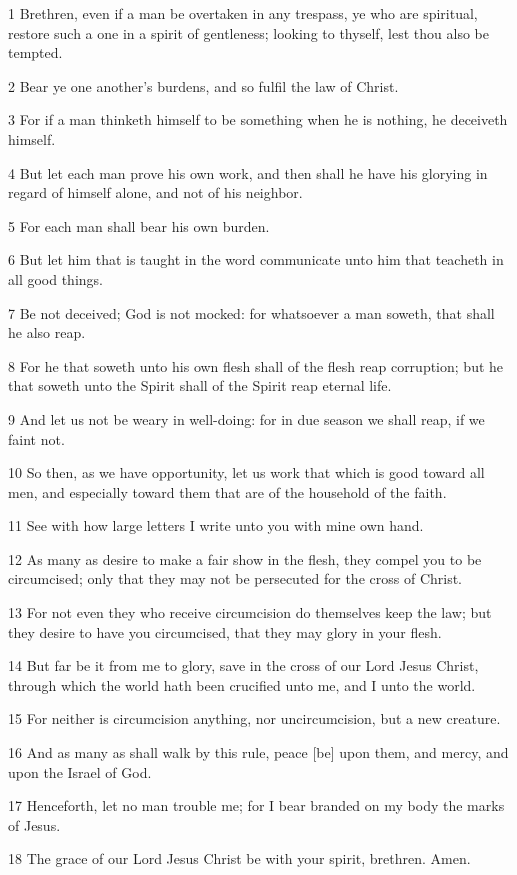 \par 1 Brethren, even if a man be overtaken in any trespass, ye who are spiritual, restore such a one in a spirit of gentleness; looking to thyself, lest thou also be tempted.
\par 2 Bear ye one another's burdens, and so fulfil the law of Christ.
\par 3 For if a man thinketh himself to be something when he is nothing, he deceiveth himself.
\par 4 But let each man prove his own work, and then shall he have his glorying in regard of himself alone, and not of his neighbor.
\par 5 For each man shall bear his own burden.
\par 6 But let him that is taught in the word communicate unto him that teacheth in all good things.
\par 7 Be not deceived; God is not mocked: for whatsoever a man soweth, that shall he also reap.
\par 8 For he that soweth unto his own flesh shall of the flesh reap corruption; but he that soweth unto the Spirit shall of the Spirit reap eternal life.
\par 9 And let us not be weary in well-doing: for in due season we shall reap, if we faint not.
\par 10 So then, as we have opportunity, let us work that which is good toward all men, and especially toward them that are of the household of the faith.
\par 11 See with how large letters I write unto you with mine own hand.
\par 12 As many as desire to make a fair show in the flesh, they compel you to be circumcised; only that they may not be persecuted for the cross of Christ.
\par 13 For not even they who receive circumcision do themselves keep the law; but they desire to have you circumcised, that they may glory in your flesh.
\par 14 But far be it from me to glory, save in the cross of our Lord Jesus Christ, through which the world hath been crucified unto me, and I unto the world.
\par 15 For neither is circumcision anything, nor uncircumcision, but a new creature.
\par 16 And as many as shall walk by this rule, peace [be] upon them, and mercy, and upon the Israel of God.
\par 17 Henceforth, let no man trouble me; for I bear branded on my body the marks of Jesus.
\par 18 The grace of our Lord Jesus Christ be with your spirit, brethren. Amen.

